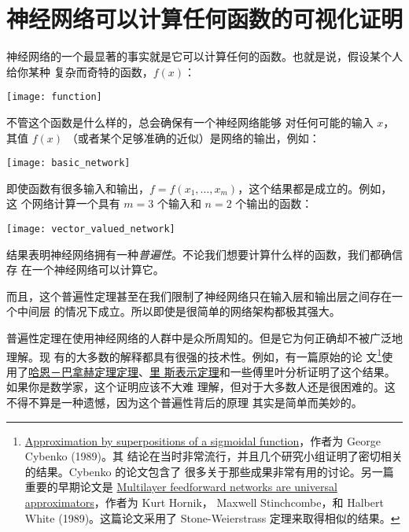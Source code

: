
\chapter{神经网络可以计算任何函数的可视化证明}
\label{ch:VisualProof}

神经网络的一个最显著的事实就是它可以计算任何的函数。也就是说，假设某个人给你某种
复杂而奇特的函数，$f(x)$：
\begin{center}
  \texttt{[image: function]}
\end{center}

\label{basic_network_precursor}不管这个函数是什么样的，总会确保有一个神经网络能够
对任何可能的输入 $x$，其值 $f(x)$ （或者某个足够准确的近似）是网络的输出，例如：
\begin{center}
  \texttt{[image: basic\_network]}
\end{center}

即使函数有很多输入和输出，$f = f(x_1, \ldots, x_m)$，这个结果都是成立的。例如，这
个网络计算一个具有 $m = 3$ 个输入和 $n = 2$ 个输出的函数：
\begin{center}
  \texttt{[image: vector\_valued\_network]}
\end{center}

结果表明神经网络拥有一种\emph{普遍性}。不论我们想要计算什么样的函数，我们都确信存
在一个神经网络可以计算它。

而且，这个普遍性定理甚至在我们限制了神经网络只在输入层和输出层之间存在一个中间层
的情况下成立。所以即使是很简单的网络架构都极其强大。

普遍性定理在使用神经网络的人群中是众所周知的。但是它为何正确却不被广泛地理解。现
有的大多数的解释都具有很强的技术性。例如，有一篇原始的论
文\footnote{\href{http://www.dartmouth.edu/~gvc/Cybenko_MCSS.pdf}{Approximation
    by superpositions of a sigmoidal function}，作者为 George Cybenko (1989)。其
  结论在当时非常流行，并且几个研究小组证明了密切相关的结果。Cybenko 的论文包含了
  很多关于那些成果非常有用的讨论。另一篇重要的早期论文是
  \href{http://www.sciencedirect.com/science/article/pii/0893608089900208}{Multilayer
    feedforward networks are universal approximators}，作者为 Kurt Hornik，
  Maxwell Stinchcombe，和 Halbert White (1989)。这篇论文采用了 Stone-Weierstrass
  定理来取得相似的结果。}使用了\href{https://zh.wikipedia.org/wiki/哈恩－巴拿赫
  定理}{哈恩－巴拿赫定理定理}、\href{https://zh.wikipedia.org/wiki/里斯表示定理}{里
  斯表示定理}和一些傅里叶分析证明了这个结果。如果你是数学家，这个证明应该不大难
理解，但对于大多数人还是很困难的。这不得不算是一种遗憾，因为这个普遍性背后的原理
其实是简单而美妙的。

